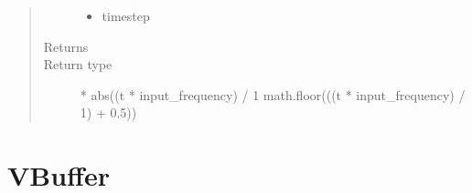 \documentclass[letterpaper,10pt,english,openany,oneside]{sphinxmanual}
\begin{document}
\begin{fulllineitems}
\begin{fulllineitems}
\begin{quote}
\begin{description}
\begin{itemize}
\item {} 
\sphinxAtStartPar
{} \textendash{} timestep

\end{itemize}

\item[{Returns}] \leavevmode
\sphinxAtStartPar


\item[{Return type}] \leavevmode
{} * abs((t * input\_frequency) / 1 \sphinxhyphen{} math.floor(((t * input\_frequency) / 1) + 0.5))

\end{description}\end{quote}

\end{fulllineitems}


\end{fulllineitems}



\section{VBuffer}
\label{\detokenize{dpav:vbuffer}}
\end{document}
